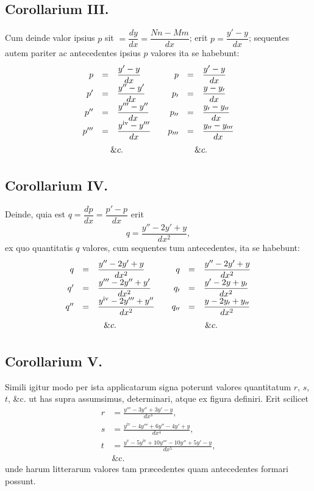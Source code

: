\subsection*{Corollarium III.}
Cum deinde valor ipsius $p$ sit $=\dfrac{dy}{dx}=\dfrac{Nn-Mm}{dx}$; erit $p=\dfrac{y'-y}{dx}$; sequentes autem pariter ac antecedentes ipsius $p$ valores ita se habebunt:
\[
\renewcommand{\arraystretch}{1.8}
\begin{array}{rclcrcl}
p&=&\dfrac{y'-y}{dx}&&p&=&\dfrac{y'-y}{dx}\\
p'&=&\dfrac{y''-y'}{dx}&&p_{\prime}&=&\dfrac{y-y_{\prime}}{dx}\\
p''&=&\dfrac{y'''-y''}{dx}&&p_{\prime\prime}&=&\dfrac{y_{\prime}-y_{\prime\prime}}{dx}\\
p'''&=&\dfrac{y^{\mathrm{iv}}-y'''}{dx}&&p_{\prime\prime\prime}&=&\dfrac{y_{\prime\prime}-y_{\prime\prime\prime}}{dx}\\
\multicolumn{3}{c}{\&c.}&&\multicolumn{3}{c}{\&c.}
\end{array}
\]

\subsection*{Corollarium IV.}
Deinde, quia est $q=\dfrac{dp}{dx}=\dfrac{p'-p}{dx}$ erit
\[
q=\frac{y''-2y'+y}{dx^2},
\]
ex quo quantitatis $q$ valores, cum sequentes tum antecedentes, ita se habebunt:
\[
\renewcommand{\arraystretch}{1.8}
\begin{array}{rclcrcl}
q&=&\dfrac{y''-2y'+y}{dx^2}&&q&=&\dfrac{y''-2y'+y}{dx^2}\\
q'&=&\dfrac{y'''-2y''+y'}{dx^2}&&q_{\prime}&=&\dfrac{y'-2y+y_{\prime}}{dx^2}\\
q''&=&\dfrac{y^{\mathrm{iv}}-2y'''+y''}{dx^2}&&q_{\prime\prime}&=&\dfrac{y-2y_{\prime}+y_{\prime\prime}}{dx^2}\\
\multicolumn{3}{c}{\&c.}&&\multicolumn{3}{c}{\&c.}
\end{array}
\]

\subsection*{Corollarium V.}
Simili igitur modo per ista applicatarum signa poterunt valores quantitatum $r$, $s$, $t$, \&c. ut has supra assumsimus, determinari, atque ex figura definiri. Erit scilicet
\[
\begin{aligned}
r&=\frac{y'''-3y''+3y'-y}{dx^3},\\[5pt]
s&=\frac{y^{\mathrm{iv}}-4y'''+6y''-4y'+y}{dx^4},\\[5pt]
t&=\frac{y^{\mathrm{v}}-5y^{\mathrm{iv}}+10y'''-10y''+5y'-y}{dx^5},\\[5pt]
&\text{\&c.}
\end{aligned}
\]
unde harum litterarum valores tam præcedentes quam antecedentes formari possunt.

